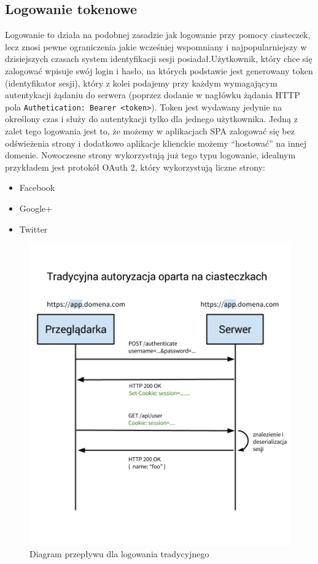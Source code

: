 \documentclass[10pt,titlepage]{article}
\begin{document}
\subsection{Logowanie tokenowe}
Logowanie to działa na podobnej zasadzie jak logowanie przy pomocy ciasteczek, lecz znosi pewne ograniczenia jakie wcześniej wspomniany i najpopularniejszy w dzisiejszych czasach system identyfikacji sesji posiadał.Użytkownik, który chce się zalogować wpisuje swój login i hasło, na których podstawie jest generowany token (identyfikator sesji), który z kolei podajemy przy każdym wymagającym autentykacji żądaniu do serwera (poprzez dodanie w nagłówku żądania HTTP pola \verb|Authetication: Bearer <token>|). Token jest wydawany jedynie na określony czas i służy do autentykacji tylko dla jednego użytkownika. Jedną z zalet tego logowania jest to, że możemy w aplikacjach SPA zalogować się bez odświeżenia strony i dodatkowo aplikacje klienckie możemy ``hostować'' na innej domenie. Nowoczesne strony wykorzystują już tego typu logowanie, idealnym przykładem jest protokół OAuth 2, który wykorzystują liczne strony:
\begin{itemize}
  \item Facebook
  \item Google+
  \item Twitter
\end{itemize}
\begin{figure}[htbp]
  \centering
  \includegraphics[scale=0.5]{images/tokenAuth1.png}
  \caption{Diagram przepływu dla logowania tradycyjnego}
\end{figure}
\end{document}
